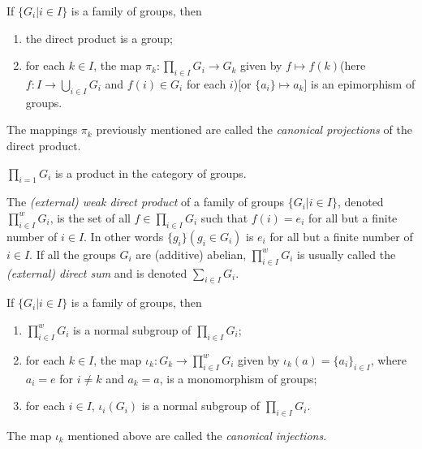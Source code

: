 \begin{Theorem}
	If $ \{G_i | i \in I \} $ is a family of groups, then
	\begin{enumerate}
		\item the direct product is a group;
		\item for each $ k \in I $, the map $ \pi_k:\prod_{i\in I} G_i \to G_k $ given by $ f \mapsto f(k) $(here $ f: I \to \bigcup_{i \in I}G_i $ and $ f(i)\in G_i $ for each $ i $)[or $ \{a_i \}\mapsto a_k $] is an epimorphism of groups.
	\end{enumerate}
\end{Theorem}
\begin{Definition}
	The mappings $ \pi_k $ previously mentioned are called the \textit{canonical projections} of the direct product.
\end{Definition}
\begin{Theorem}
	$ \prod_{i=1} G_i $ is a product in the category of groups.
\end{Theorem}
\begin{Definition}
	The \textit{(external) weak direct product} of a family of groups $ \{G_i | i\in I \} $, denoted $ \prod_{i \in I}^{w}G_i $, is the set of all $ f \in \prod_{i \in I}G_i $ such that $ f(i)=e_i $ for all but a finite number of $ i \in I $. In other words $ \{g_ i\} (g_i \in G_i)$ is $ e_i $ for all but a finite number of $ i \in I $. If all the groups $ G_i $ are (additive) abelian, $ \prod_{i \in I}^{w}G_i $ is usually called the \textit{(external) direct sum} and is denoted $ \sum_{i \in I}G_i $.
\end{Definition}
\begin{Theorem}
	If $ \{G_i | i \in I \} $ is a family of groups, then
	\begin{enumerate}
		\item $ \prod_{i \in I}^{w}G_i $ is a normal subgroup of $ \prod_{i \in I} G_i $;
		\item for each $ k \in I $, the map $ \iota_k:G_k \to \prod_{i \in I}^{w}G_i  $ given by $ \iota_k(a)=\{a_i \}_{i \in I} $, where $ a_i=e $ for $ i \neq k $ and $ a_k = a $, is a monomorphism of groups;
		\item for each $ i \in I $, $ \iota_i(G_i) $ is a normal subgroup of $ \prod_{i \in I} G_i $.
	\end{enumerate}
\end{Theorem}
\begin{Definition}
	The map $ \iota_k $ mentioned above are called the \textit{canonical injections}.
\end{Definition}
